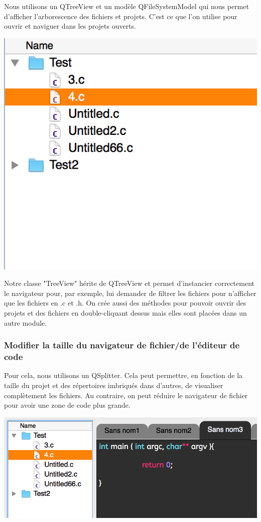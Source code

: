 \documentclass[a4paper,12pt]{article}
\begin{document}
				Nous utilisons un QTreeView et un modèle QFileSystemModel qui nous permet d'afficher l'arborescence des fichiers et projets. C'est ce que l'on utilise pour ouvrir et naviguer dans les projets ouverts.\\
			\begin{center}
				\includegraphics[scale=0.6]{images/QTreeView}
				\vspace{0.6cm}
			\end{center}
			Notre classe "TreeView" hérite de QTreeView et permet d'instancier correctement le navigateur pour, par exemple, lui demander de filtrer les fichiers pour n'afficher que les fichiers en .c et .h. On crée aussi des méthodes pour pouvoir ouvrir des projets et des fichiers en double-cliquant dessus mais elles sont placées dans un autre module.\\
			
			\subsubsection*{Modifier la taille du navigateur de fichier/de l'éditeur de code}
				Pour cela, nous utilisons un QSplitter. Cela peut permettre, en fonction de la taille du projet et des répertoires imbriqués dans d'autres, de visualiser complètement les fichiers. Au contraire, on peut réduire le navigateur de fichier pour avoir une zone de code plus grande.\\
			\begin{center}
				\includegraphics[scale=0.6]{images/QSplitter_1}
				\vspace{0.6cm}
			\end{center}
\end{document}
